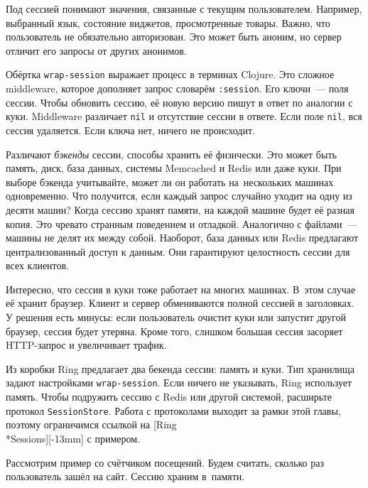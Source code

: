 Под сессией понимают значения, связанные с текущим пользователем. Например,
выбранный язык, состояние виджетов, просмотренные товары. Важно, что
пользователь не обязательно авторизован. Это может быть аноним, но сервер
отличит его запросы от других анонимов.


Обёртка \verb|wrap-session| выражает процесс в терминах Clojure. Это сложное
middleware, которое дополняет запрос словарём \verb|:session|. Его ключи~---
поля сессии. Чтобы обновить сессию, её новую версию пишут в ответ по аналогии с
куки. Middleware различает \verb|nil| и отсутствие сессии в ответе. Если поле
\verb|nil|, вся сессия удаляется. Если ключа нет, ничего не происходит.


Различают \emph{бэкенды} сессии, способы хранить её физически. Это может быть
память, диск, база данных, системы Memcached и Redis или даже куки. При выборе
бэкенда учитывайте, может ли он работать на~нескольких машинах одновременно. Что
получится, если каждый запрос случайно уходит на одну из десяти машин? Когда
сессию хранят памяти, на каждой машине будет её разная копия. Это чревато
странным поведением и отладкой. Аналогично с файлами~--- машины не делят их
между собой. Наоборот, база данных или Redis предлагают централизованный доступ
к данным. Они гарантируют целостность сессии для всех клиентов.

Интересно, что сессия в куки тоже работает на многих машинах. В~этом случае её
хранит браузер. Клиент и сервер обмениваются полной сессией в заголовках. У
решения есть минусы: если пользователь очистит куки или запустит другой браузер,
сессия будет утеряна. Кроме того, слишком большая сессия засоряет HTTP-запрос и
увеличивает трафик.

Из коробки Ring предлагает два бекенда сессии: память и куки. Тип хранилища
задают настройками \verb|wrap-session|. Если ничего не указывать, Ring
использует память. Чтобы подружить сессию с Redis или другой системой, расширьте
протокол \verb|SessionStore|. Работа с протоколами выходит за рамки этой главы,
поэтому ограничимся ссылкой на
[Ring\\*Sessions][-13mm]
с примером.

Рассмотрим пример со счётчиком посещений. Будем считать, сколько раз
пользователь зашёл на сайт. Сессию храним в~памяти.

